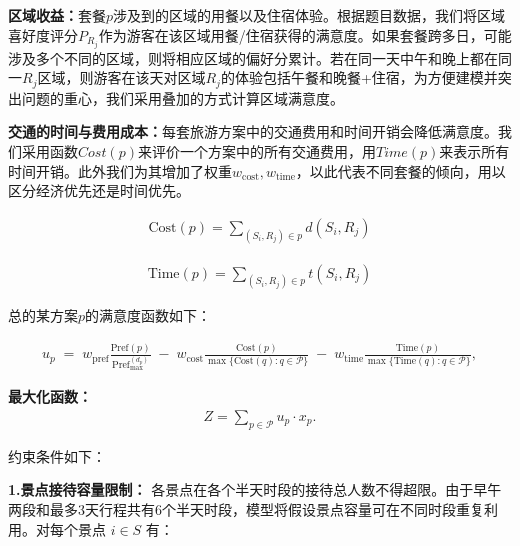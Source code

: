 \textbf{区域收益：}套餐$p$涉及到的区域的用餐以及住宿体验。根据题目数据，我们将区域喜好度评分$P_{R_{j}}$作为游客在该区域用餐/住宿获得的满意度。如果套餐跨多日，可能涉及多个不同的区域，则将相应区域的偏好分累计。若在同一天中午和晚上都在同一$R_{j}$区域，则游客在该天对区域$R_{j}$的体验包括午餐和晚餐+住宿，为方便建模并突出问题的重心，我们采用叠加的方式计算区域满意度。

\textbf{交通的时间与费用成本：}每套旅游方案中的交通费用和时间开销会降低满意度。我们采用函数$Cost(p)$来评价一个方案中的所有交通费用，用$Time(p)$来表示所有时间开销。此外我们为其增加了权重$w_{\text{cost}}, w_{\text{time}}$，以此代表不同套餐的倾向，用以区分经济优先还是时间优先。

\begin{equation}
\begin{aligned}
  \text{Cost}(p) = \sum_{(S_i,R_j)\in p}{d(S_i,R_j)}
\end{aligned}
\end{equation}

\begin{equation}
  \begin{aligned}
    \text{Time}(p) = \sum_{(S_i,R_j)\in p}{t(S_i,R_j)}
  \end{aligned}
\end{equation}
  



总的某方案$p$的满意度函数如下：

\begin{equation}
\begin{aligned}
  u_p \;=\; w_{\text{pref}}\frac{\text{Pref}(p)}{\text{Pref}_{\max}^{(d_p)}} \;-\; w_{\text{cost}}\frac{\text{Cost}(p)}{\max\{\text{Cost}(q):q\in \mathcal{P}\}} \;-\; w_{\text{time}}\frac{\text{Time}(p)}{\max\{\text{Time}(q):q\in \mathcal{P}\}},
\end{aligned}
\end{equation}

\textbf{最大化函数：}
\begin{equation}
  \begin{aligned}
    Z = \sum_{p\in \mathcal{P}}u_{p}\cdot x_{p}.
  \end{aligned}
\end{equation}

约束条件如下：

\noindent\textbf{1.景点接待容量限制：}
各景点在各个半天时段的接待总人数不得超限。由于早午两段和最多3天行程共有6个半天时段，模型将假设景点容量可在不同时段重复利用。对每个景点 $i\in S$ 有：

